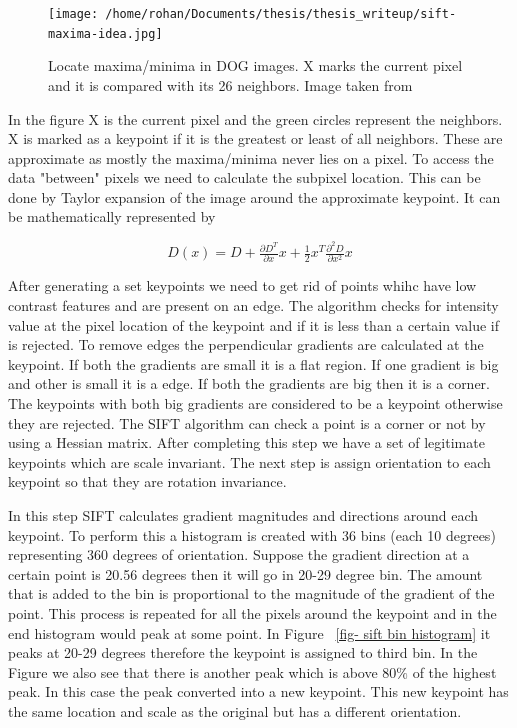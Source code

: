\documentclass[12pt]{dalcsthesis}
\begin{document}
\begin{figure}
  \centering
     {\texttt{[image: /home/rohan/Documents/thesis/thesis\_writeup/sift-maxima-idea.jpg]}}
  \caption{\label{fig- maxima and minima sift octaves} Locate maxima/minima in DOG images. X marks the current pixel and it is compared with its 26 neighbors. Image taken from \cite{sift_url}}
\end{figure}

In the figure X is the current pixel and the green circles represent the neighbors. X is marked as a keypoint if it is the greatest or least of all neighbors. These are approximate as mostly the maxima/minima never lies on a pixel. To access the data "between" pixels we need to calculate the subpixel location. This can be done by Taylor expansion of the image around the approximate keypoint. It can be mathematically represented by 

\begin{equation}
D(x) = D + \tfrac{\partial D^{T}}{\partial x}x+\tfrac{1}{2}x^{T}\tfrac{\partial^{2} D}{\partial x^{2}}x
\end{equation}

After generating a set keypoints we need to get rid of points whihc have low contrast features and are present on an edge. The algorithm checks for intensity value at the pixel location of the keypoint and if it is less than a certain value if is rejected. To remove edges the perpendicular gradients are calculated at the keypoint. If both the gradients are small it is a flat region. If one gradient is big and other is small it is a edge. If both the gradients are big then it is a corner. The keypoints with both big gradients are considered to be a keypoint otherwise they are rejected. The SIFT algorithm can check a point is a corner or not by using a Hessian matrix. After completing this step we have a set of legitimate keypoints which are scale invariant. The next step is assign orientation to each keypoint so that they are rotation invariance. 

In this step SIFT calculates gradient magnitudes and directions around each keypoint. To perform this a histogram is created with 36 bins (each 10 degrees) representing 360 degrees of orientation. Suppose the gradient direction at a certain point is 20.56 degrees then it will go in 20-29 degree bin. The amount that is added to the bin is proportional to the magnitude of the gradient of the point. This process is repeated for all the pixels around the keypoint and in the end histogram would peak at some point. In Figure ~\ref{fig- sift bin histogram} it peaks at 20-29 degrees therefore the keypoint is assigned to third bin. In the Figure we also see that there is another peak which is above $80 \%$ of the highest peak. In this case the peak converted into a new keypoint. This new keypoint has the same location and scale as the original but has a different orientation. 
\end{document}
